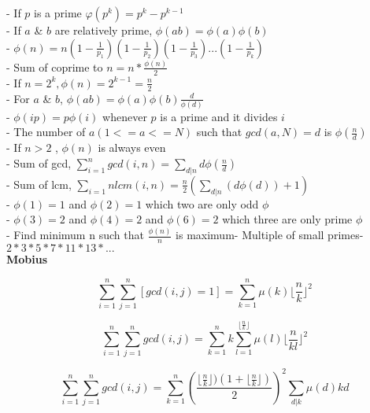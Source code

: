 - If \( p \) is a prime \( φ(p^k) = p^k - p^{k-1} \) \\
- If \( a \) & \( b \) are relatively prime, \( \phi(ab) = \phi(a)\phi(b) \) \\
- \( \phi(n) = n(1-\frac{1}{p_1})(1-\frac{1}{p_2})(1-\frac{1}{p_3})...(1-\frac{1}{p_k}) \) \\
- Sum of coprime to \( n = n * \frac{\phi(n)}{2} \) \\
- If \( n = 2^k, \phi(n) = 2^{k - 1} = \frac{n}{2} \) \\
- For \( a \) & \( b \), \( \phi(ab) = \phi(a)\phi(b)\frac{d}{\phi(d)} \) \\
- \( \phi (ip) = p \phi(i) \) whenever \( p \) is a prime and it divides \( i \) \\
- The number of \( a (1<= a <=N) \) such that \( gcd(a, N)=d \) is \( \phi(\frac{n}{d}) \) \\
- If \( n > 2 \) , \( \phi(n) \) is always even \\
- Sum of gcd, \( \sum_{i=1}^n gcd(i, n) = \sum_{d|n} d \phi(\frac{n}{d}) \) \\
- Sum of lcm, \( \sum_{i=1}{n}lcm(i, n) = \frac{n}{2}(\sum_{d|n}(d \phi(d))+1) \) \\
- \( \phi(1) = 1 \) and \( \phi(2) = 1 \) which two are only odd \( \phi \) \\
- \( \phi(3) = 2 \) and \( \phi(4) = 2 \) and \( \phi(6) = 2 \) which three are only prime \( \phi \) \\
- Find minimum n such that $ \frac{\phi(n)} {n} $ is  maximum- Multiple of small primes- $ 2 * 3 * 5 * 7 * 11 * 13 * ... $ \\

\textbf{Mobius}

\[ \sum_{i = 1}^n \sum_{j = 1}^n [gcd(i, j) = 1] = \sum_{k = 1}^n \mu(k) \lfloor \frac{n}{k} \rfloor^2 \]

\[ \sum_{i = 1}^n \sum_{j = 1}^n gcd(i, j) = \sum_{k = 1}^n k \sum_{l = 1}^{\lfloor \frac{n}{k} \rfloor} \mu(l) \lfloor {\frac{n}{kl}} \rfloor^2 \]

\[ \sum_{i = 1}^n \sum_{j = 1}^n gcd(i, j) = \sum_{k = 1}^n (\frac{\lfloor \frac{n}{k} \rfloor) (1 + \lfloor \frac{n}{k} \rfloor) }{2})^2 \sum_{d | k} \mu (d) kd \]